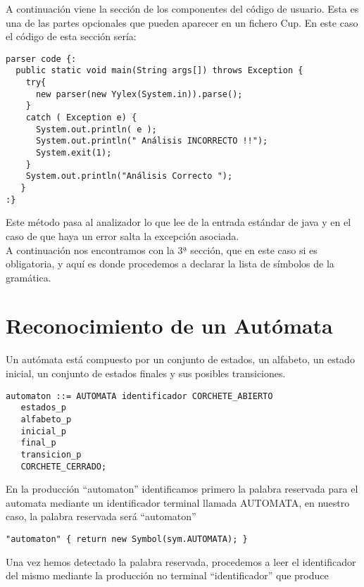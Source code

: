\documentclass{llncs}
\begin{document}
A continuación viene la sección de los componentes del código de usuario. Esta es una de las partes opcionales que
pueden aparecer en un fichero Cup. En este caso el código de esta sección sería:

\begin{verbatim}
parser code {:
  public static void main(String args[]) throws Exception {
    try{
      new parser(new Yylex(System.in)).parse();  
    }
    catch ( Exception e) {
      System.out.println( e );
      System.out.println(" Análisis INCORRECTO !!");
      System.exit(1);
    }
    System.out.println("Análisis Correcto ");
   }
:}
\end{verbatim}

Este método pasa al analizador lo que lee de la entrada estándar de java y en el caso de que haya un error salta la
excepción asociada.\\

A continuación nos encontramos con la 3ª sección, que en este caso si es obligatoria, y aquí es donde procedemos a
declarar la lista de símbolos de la gramática.\\



\section{Reconocimiento de un Autómata}

Un autómata está compuesto por un conjunto de estados, un alfabeto, un estado inicial, un conjunto de estados finales y sus posibles transiciones.

\begin{verbatim}
automaton ::= AUTOMATA identificador CORCHETE_ABIERTO
   estados_p
   alfabeto_p
   inicial_p
   final_p
   transicion_p
   CORCHETE_CERRADO;
\end{verbatim} 

En la producción “automaton” identificamos primero la palabra reservada para el automata mediante un identificador terminal llamada AUTOMATA, en nuestro caso, la palabra reservada será “automaton”

\begin{verbatim}
"automaton" { return new Symbol(sym.AUTOMATA); }
\end{verbatim} 

Una vez hemos detectado la palabra reservada, procedemos a leer el identificador del mismo mediante la producción no terminal “identificador” que produce
\end{document}
